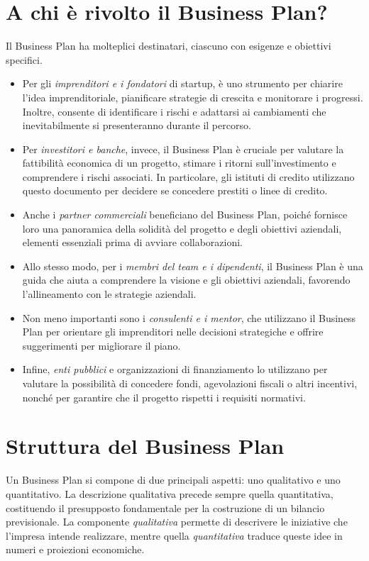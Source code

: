 \section{A chi è rivolto il Business Plan?}
Il Business Plan ha molteplici destinatari, ciascuno con esigenze e obiettivi specifici. 
\begin{itemize}
    \item Per gli \textit{imprenditori e i fondatori} di startup, è uno strumento per chiarire l’idea imprenditoriale, pianificare strategie di crescita e monitorare i progressi. Inoltre, consente di identificare i rischi e adattarsi ai cambiamenti che inevitabilmente si presenteranno durante il percorso.
    \item Per \textit{investitori e banche}, invece, il Business Plan è cruciale per valutare la fattibilità economica di un progetto, stimare i ritorni sull’investimento e comprendere i rischi associati. In particolare, gli istituti di credito utilizzano questo documento per decidere se concedere prestiti o linee di credito.
    \item Anche i \textit{partner commerciali} beneficiano del Business Plan, poiché fornisce loro una panoramica della solidità del progetto e degli obiettivi aziendali, elementi essenziali prima di avviare collaborazioni. 
    \item Allo stesso modo, per i \textit{membri del team e i dipendenti}, il Business Plan è una guida che aiuta a comprendere la visione e gli obiettivi aziendali, favorendo l’allineamento con le strategie aziendali.
    \item Non meno importanti sono i \textit{consulenti e i mentor}, che utilizzano il Business Plan per orientare gli imprenditori nelle decisioni strategiche e offrire suggerimenti per migliorare il piano. 
    \item Infine, \textit{enti pubblici} e organizzazioni di finanziamento lo utilizzano per valutare la possibilità di concedere fondi, agevolazioni fiscali o altri incentivi, nonché per garantire che il progetto rispetti i requisiti normativi.
\end{itemize}

\section{Struttura del Business Plan}
Un Business Plan si compone di due principali aspetti: uno qualitativo e uno quantitativo. La descrizione qualitativa precede sempre quella quantitativa, costituendo il presupposto fondamentale per la costruzione di un bilancio previsionale. La componente \textit{qualitativa} permette di descrivere le iniziative che l’impresa intende realizzare, mentre quella \textit{quantitativa} traduce queste idee in numeri e proiezioni economiche.


